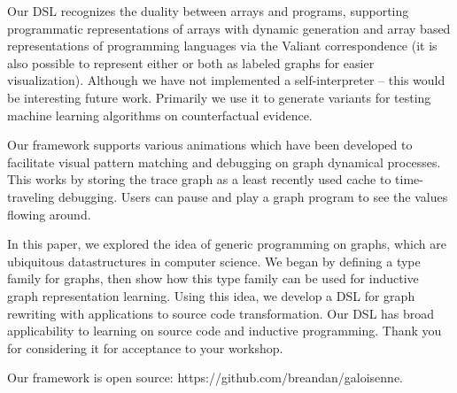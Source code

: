 \documentclass[sigplan,10pt,review,anonymous]{acmart}
\begin{document}
Our DSL recognizes the duality between arrays and programs, supporting programmatic representations of arrays with dynamic generation and array based representations of programming languages via the Valiant correspondence (it is also possible to represent either or both as labeled graphs for easier visualization). Although we have not implemented a self-interpreter -- this would be interesting future work. Primarily we use it to generate variants for testing machine learning algorithms on counterfactual evidence.

Our framework supports various animations which have been developed to facilitate visual pattern matching and debugging on graph dynamical processes. This works by storing the trace graph as a least recently used cache to time-traveling debugging. Users can pause and play a graph program to see the values flowing around.

In this paper, we explored the idea of generic programming on graphs, which are ubiquitous datastructures in computer science. We began by defining a type family for graphs, then show how this type family can be used for inductive graph representation learning. Using this idea, we develop a DSL for graph rewriting with applications to source code transformation. Our DSL has broad applicability to learning on source code and inductive programming. Thank you for considering it for acceptance to your workshop.







Our framework is open source: https://github.com/breandan/galoisenne.

%
%
%
%
%
%
\end{document}
